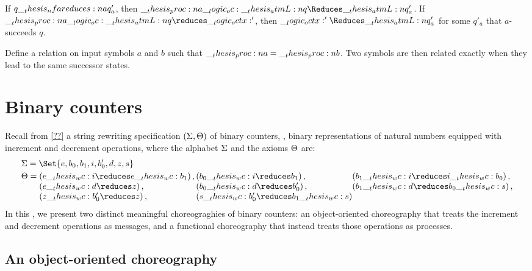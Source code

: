 \begin{corollary}
  If $q \nfareduces[a] q'_a$, then $\proc{a} \oc \atmL{q} \Reduces \atmL{q}'_a$.
  If $\proc{a} \oc \atmL{q} \reduces \octx'$, then $\octx' \Reduces \atmL{q}'_a$ for some $q'_a$ that $a$-succeeds $q$.
\end{corollary}

Define a relation on input symbols $a$ and $b$ such that $\__thesis_proc:n {a} = \__thesis_proc:n {b}$.
Two symbols are then related exactly when they lead to the same successor states.

\section{Binary counters}\label{sec:formula-as-process:counters}

Recall from \cref{??} a string rewriting specification $(\Sigma, \Theta)$ of binary counters, \ie, binary representations of natural numbers equipped with increment and decrement operations, where the alphabet $\Sigma$ and the axioms $\Theta$ are:
\begin{equation*}
  \begin{lgathered}
    \sralph = \Set{e, b_0, b_1, i, b'_0, d, z, s}
    \\
    \srsig
      = \begin{array}[t]{@{}l@{}l@{}l@{}}
          (e \wc i \reduces e \wc b_1) \,, {} &
          (b_0 \wc i \reduces b_1) \,, &
          (b_1 \wc i \reduces i \wc b_0) \,, \\
          (e \wc d \reduces z) \,, &
          (b_0 \wc d \reduces b'_0) \,, {} &
          (b_1 \wc d \reduces b_0 \wc s) \,, \\
          (z \wc b'_0 \reduces z) \,, &
          (s \wc b'_0 \reduces b_1 \wc s)
        \end{array}
  \end{lgathered}
\end{equation*}
In this , we present two distinct meaningful choreograghies of binary counters: an object-oriented choreography that treats the increment and decrement operations as messages, and a functional choreography that instead treats those operations as processes. 

\subsection{An object-oriented choreography}

